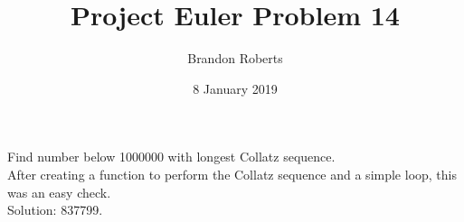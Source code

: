 \documentclass{article}
\begin{document}
\title{Project Euler Problem 14}
\author{Brandon Roberts}
\date{8 January 2019}

\maketitle

Find number below 1000000 with longest Collatz sequence.\\
After creating a function to perform the Collatz sequence and a simple loop, this was an easy check.\\
Solution: 837799.
\end{document}

